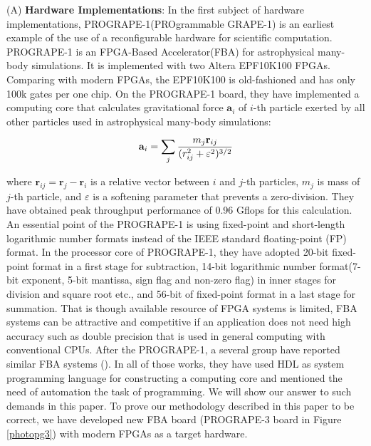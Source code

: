 \documentclass{article}
\begin{document}
(A) {\bf Hardware Implementations}:
In the first subject of hardware implementations,
PROGRAPE-1(PROgrammable GRAPE-1)\cite{HFKM00} is
an earliest example of the use of a reconfigurable hardware for
scientific computation.  PROGRAPE-1 is an FPGA-Based Accelerator(FBA)
for astrophysical many-body simulations. It is implemented with two
Altera EPF10K100 FPGAs. Comparing with modern FPGAs, the EPF10K100 is
old-fashioned and has only 100k gates per one chip.
On the PROGRAPE-1 board, they have implemented a computing core
that calculates gravitational force
$\mathbf{a}_i$ of $i$-th particle exerted by all other particles
used in astrophysical many-body simulations:

\begin{equation}
\mathbf{ a}_i = \sum_j {m_j \mathbf{ r}_{ij} \over (r_{ij}^2 + \varepsilon^2)^{3/2}}
\end{equation}

where $\mathbf{r}_{ij} = \mathbf{r}_j - \mathbf{r}_i $ is a relative
vector between $i$ and $j$-th particles, $m_{j}$ is mass of $j$-th
particle, and $\varepsilon$ is a softening parameter that prevents a
zero-division.  They have obtained peak throughput performance of 0.96
Gflops for this calculation.  An essential point of the PROGRAPE-1 is
using fixed-point and short-length logarithmic number formats instead
of the IEEE standard floating-point (FP) format.  In the processor
core of PROGRAPE-1, they have adopted 20-bit fixed-point format
 in a first stage for subtraction, 14-bit logarithmic number
format(7-bit exponent, 5-bit mantissa, sign flag and non-zero flag)
 in inner stages for division and square root etc., and 
56-bit of fixed-point format in a last stage for summation.  That is though available
resource of FPGA systems is limited, FBA systems can be attractive and
competitive if an application does not need high accuracy such as
double precision that is used in general computing with conventional
CPUs.  After the PROGRAPE-1, a several group have reported similar FBA
systems (\cite{LKM02}\cite{SS03}\cite{AKEDC04}).  In all of those
works, they have used HDL as system programming language for
constructing a computing core and mentioned the need of automation the
task of programming.  We will show our answer to such demands in this
paper.  To prove our methodology described in this paper to be
correct, we have developed new FBA board (PROGRAPE-3 board in Figure
\ref{photopg3}) with modern FPGAs as a target hardware.
\end{document}
